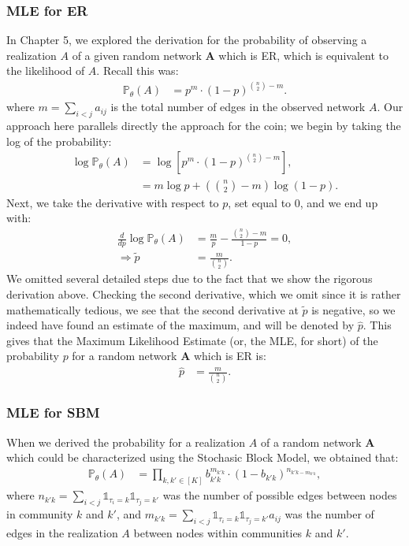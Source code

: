 \documentclass[letterpaper,10pt,english]{jupyterBook}
\begin{document}
\subsubsection{MLE for ER}
\label{\detokenize{representations/ch6/estimating-parameters_theory:mle-for-er}}
\sphinxAtStartPar
In Chapter 5, we explored the derivation for the probability of observing a realization \(A\) of a given random network \(\mathbf A\) which is ER, which is equivalent to the likelihood of \(A\). Recall this was:
\begin{align*}
    \mathbb P_\theta(A) &= p^{m} \cdot (1 - p)^{\binom{n}{2} - m}.
\end{align*}
\sphinxAtStartPar
where \(m = \sum_{i < j} a_{ij}\) is the total number of edges in the observed network \(A\). Our approach here parallels directly the approach for the coin; we begin by taking the log of the probability:
\begin{align*}
    \log \mathbb P_\theta(A) &= \log \left[p^{m} \cdot (1 - p)^{\binom{n}{2} - m}\right], \\
    &= m \log p + \left(\binom n 2 - m\right)\log (1 - p).
\end{align*}
\sphinxAtStartPar
Next, we take the derivative with respect to \(p\), set equal to \(0\), and we end up with:
\begin{align*}
\frac{d}{d p}\log \mathbb P_\theta(A) &= \frac{m}{p} - \frac{\binom n 2 - m}{1 - p} = 0, \\
\Rightarrow \tilde p &= \frac{m}{\binom n 2}.
\end{align*}
\sphinxAtStartPar
We omitted several detailed steps due to the fact that we show the rigorous derivation above. Checking the second derivative, which we omit since it is rather mathematically tedious, we see that the second derivative at \(\tilde p\) is negative, so we indeed have found an estimate of the maximum, and will be denoted by \(\hat p\). This gives that the Maximum Likelihood Estimate (or, the MLE, for short) of the probability \(p\) for a random network \(\mathbf A\) which is ER is:
\begin{align*}
    \hat p &= \frac{m}{\binom n 2}.
\end{align*}

\subsubsection{MLE for SBM}
\label{\detokenize{representations/ch6/estimating-parameters_theory:mle-for-sbm}}
\sphinxAtStartPar
When we derived the probability for a realization \(A\) of a random network \(\mathbf A\) which could be characterized using the  Stochasic Block Model, we obtained that:
\begin{align*}
    \mathbb P_\theta(A) &= \prod_{k, k' \in [K]}b_{k'k}^{m_{k'k}} \cdot (1 - b_{k'k})^{n_{k'k - m_{k'k}}},
\end{align*}
\sphinxAtStartPar
where \(n_{k'k} = \sum_{i < j}\mathbb 1_{\tau_i = k}\mathbb 1_{\tau_j = k'}\) was the number of possible edges between nodes in community \(k\) and \(k'\), and \(m_{k'k} = \sum_{i < j}\mathbb 1_{\tau_i = k}\mathbb 1_{\tau_j = k'}a_{ij}\) was the number of edges in the realization \(A\) between nodes within communities \(k\) and \(k'\).
\end{document}
